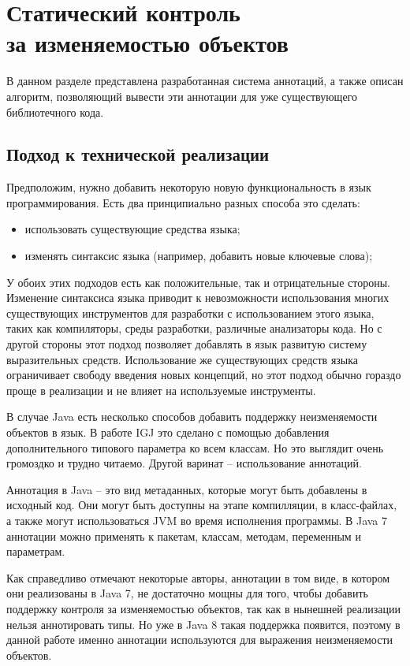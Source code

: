 \chapter{Статический контроль \\ за изменяемостью объектов}

В данном разделе представлена разработанная система аннотаций, а также описан алгоритм, позволяющий вывести эти аннотации для уже существующего библиотечного кода. 

\section{Подход к технической реализации}

Предположим, нужно добавить некоторую новую функциональность в язык программирования. Есть два принципиально разных способа это сделать:
\begin{itemize}
	\item использовать существующие средства языка;
	\item изменять синтаксис языка (например, добавить новые ключевые слова);
\end{itemize}

У обоих этих подходов есть как положительные, так и отрицательные стороны. Изменение синтаксиса языка приводит к невозможности использования многих существующих инструментов для разработки с использованием этого языка, таких как компиляторы, среды разработки, различные анализаторы кода. Но с другой стороны этот подход позволяет добавлять в язык развитую систему выразительных средств. Использование же существующих средств языка ограничивает свободу введения новых концепций, но этот подход обычно гораздо проще в реализации и не влияет на используемые инструменты.

В случае Java есть несколько способов добавить поддержку неизменяемости объектов в язык. В работе IGJ это сделано с помощью добавления дополнительного типового параметра ко всем классам. Но это выглядит очень громоздко и трудно читаемо. Другой варинат -- использование аннотаций. 

Аннотация в Java -- это вид метаданных, которые могут быть добавлены в исходный код. Они могут быть доступны на этапе компилляции, в класс-файлах, а также могут использоваться JVM во время исполнения программы. В Java 7 аннотации можно применять к пакетам, классам, методам, переменным и параметрам. 

Как справедливо отмечают некоторые авторы, аннотации в том виде, в котором они реализованы в Java 7, не достаточно мощны для того, чтобы добавить поддержку контроля за изменяемостью объектов, так как в нынешней реализации нельзя аннотировать типы. Но уже в Java 8 такая поддержка появится, поэтому в данной работе именно аннотации используются для выражения неизменяемости объектов.

